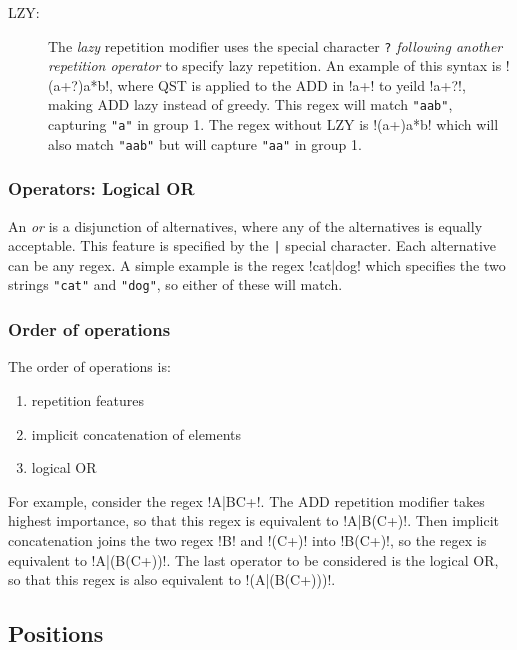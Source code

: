 \begin{description}
\item[LZY:] The \emph{lazy} repetition modifier uses the special character \verb!?! \emph{following another repetition operator} to specify lazy repetition.  An example of this syntax is \cverb!(a+?)a*b!, where QST is applied to the ADD in \cverb!a+! to yeild \cverb!a+?!, making ADD lazy instead of greedy.  This regex will match \verb!"aab"!, capturing \verb!"a"! in group 1.  The regex without LZY is \cverb!(a+)a*b! which will also match \verb!"aab"! but will capture \verb!"aa"! in group 1.
\end{description}

\subsubsection*{Operators: Logical OR}
\begin{description} \itemsep -1pt
\item[OR:] An \emph{or} is a disjunction of alternatives, where any of the alternatives is equally acceptable.  This feature is specified by the \verb!|! special character.  Each alternative can be any regex.  A simple example is the regex \cverb!cat|dog! which specifies the two strings \verb!"cat"! and \verb!"dog"!, so either of these will match.
\end{description}

\subsubsection*{Order of operations}
\label{sec:orderOfOperations}
The order of operations is:
\begin{enumerate}\itemsep -1pt
\item repetition features
\item implicit concatenation of elements
\item logical OR
\end{enumerate}
For example, consider the regex \cverb!A|BC+!.  The ADD repetition modifier takes highest importance, so that this regex is equivalent to \cverb!A|B(C+)!.  Then implicit concatenation joins the two regex \cverb!B! and \cverb!(C+)! into \cverb!B(C+)!, so the regex is equivalent to \cverb!A|(B(C+))!.  The last operator to be considered is the logical OR, so that this regex is also equivalent to \cverb!(A|(B(C+)))!.

\subsection*{Positions}

